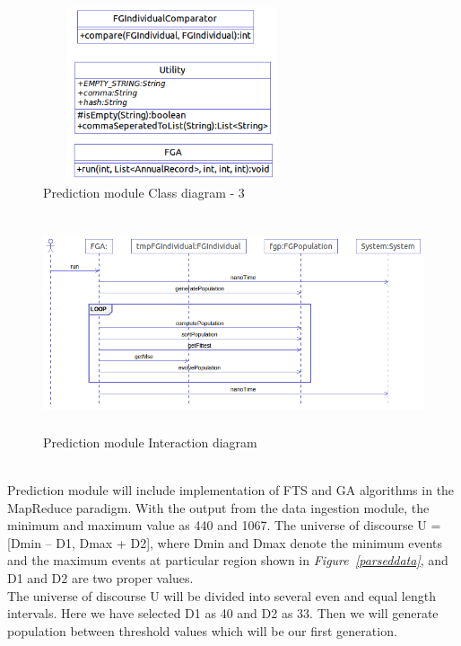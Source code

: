 \documentclass[12pt,journal,compsoc]{IEEEtran}
\begin{document}
\begin{figure}
\includegraphics[height=2in,width=3in]{gafts_class_3}
\caption{Prediction module Class diagram - 3}
\label{gafts_class_3}
\end{figure}

\begin{figure}
\includegraphics[height=2.5in,width=6.5in]{gafts_interact}
\caption{Prediction module Interaction diagram}
\label{gafts_interact}
\end{figure}


\\\indent Prediction module will include implementation of FTS and GA algorithms in the MapReduce paradigm. With the output from  the data ingestion module, the minimum and maximum value as 440 and 1067. The universe of discourse U = [Dmin – D1, Dmax + D2], where Dmin and Dmax denote the minimum events and the maximum events at particular region shown in \emph{Figure~\ref{parseddata}}, and D1 and D2 are two proper values. 
\\\indent The universe of discourse U will be divided into several even and equal length intervals. Here we have selected D1 as 40 and D2 as 33. Then we will generate population between threshold values which will be our first generation.
\end{document}
